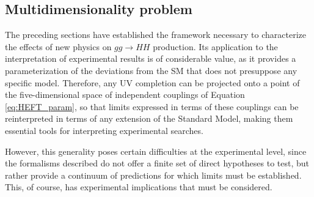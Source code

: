 

\subsection{Multidimensionality problem}
\label{subsec:multidimensionality}
%
The preceding sections have established the framework necessary to characterize the effects of new physics on $gg\to HH$ production. Its application to the interpretation of experimental results is of considerable value, as it provides a parameterization of the deviations from the SM that does not presuppose any specific model. Therefore, any UV completion can be projected onto a point of the five-dimensional space of independent couplings of Equation \ref{eq:HEFT_param}, so that limits expressed in terms of these couplings can be reinterpreted in terms of any extension of the Standard Model, making them essential tools for interpreting experimental searches.


However, this generality poses certain difficulties at the experimental level, since the formalisms described do not offer a finite set of direct hypotheses to test, but rather provide a continuum of predictions for which limits must be established. This, of course, has experimental implications that must be considered.

